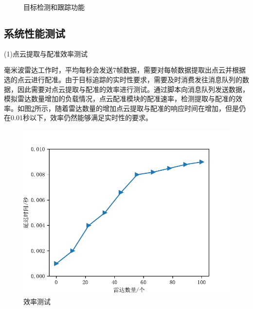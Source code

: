 \begin{figure}[htbp]
    \centering
    \caption{目标检测和跟踪功能}
    \label{fig:目标检测和跟踪功能}    
\end{figure}
\par

\subsection{系统性能测试}
\par
(1)点云提取与配准效率测试
\par
毫米波雷达工作时，平均每秒会发送7帧数据，需要对每帧数据提取出点云并根据选的点云进行配准。由于目标追踪的实时性要求，需要及时消费发往消息队列的数据，因此需要对点云提取与配准的效率进行测试。通过脚本向消息队列发送数据，模拟雷达数量增加的负载情况，点云配准模块的配准速率，检测提取与配准的效率。如图\ref{fig:效率测试}所示，随着雷达数量的增加点云提取与配准的响应时间在增加，但是仍在0.01秒以下，效率仍然能够满足实时性的要求。

\begin{figure}[htbp]
    \centering
    \includegraphics[width = 0.6\linewidth]{figures/效率测试.pdf}
    \caption{效率测试}
    \label{fig:效率测试}    
\end{figure}

